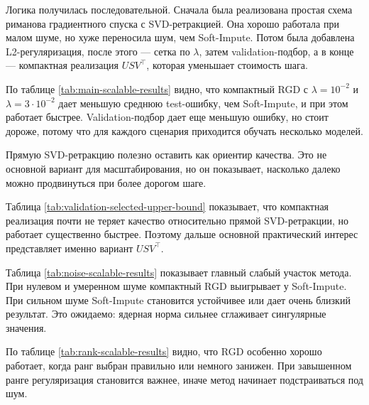 \documentclass[a4paper,12pt]{article}
\begin{document}
Логика получилась последовательной. Сначала была реализована простая схема риманова градиентного спуска с SVD-ретракцией. Она хорошо работала при малом шуме, но хуже переносила шум, чем Soft-Impute. Потом была добавлена L2-регуляризация, после этого --- сетка по $\lambda$, затем validation-подбор, а в конце --- компактная реализация $USV^\top$, которая уменьшает стоимость шага.





По таблице \ref{tab:main-scalable-results} видно, что компактный RGD с $\lambda=10^{-2}$ и $\lambda=3\cdot 10^{-2}$ дает меньшую среднюю test-ошибку, чем Soft-Impute, и при этом работает быстрее. Validation-подбор дает еще меньшую ошибку, но стоит дороже, потому что для каждого сценария приходится обучать несколько моделей.

Прямую SVD-ретракцию полезно оставить как ориентир качества. Это не основной вариант для масштабирования, но он показывает, насколько далеко можно продвинуться при более дорогом шаге.



Таблица \ref{tab:validation-selected-upper-bound} показывает, что компактная реализация почти не теряет качество относительно прямой SVD-ретракции, но работает существенно быстрее. Поэтому дальше основной практический интерес представляет именно вариант $USV^\top$.



Таблица \ref{tab:noise-scalable-results} показывает главный слабый участок метода. При нулевом и умеренном шуме компактный RGD выигрывает у Soft-Impute. При сильном шуме Soft-Impute становится устойчивее или дает очень близкий результат. Это ожидаемо: ядерная норма сильнее сглаживает сингулярные значения.



По таблице \ref{tab:rank-scalable-results} видно, что RGD особенно хорошо работает, когда ранг выбран правильно или немного занижен. При завышенном ранге регуляризация становится важнее, иначе метод начинает подстраиваться под шум.


\end{document}
